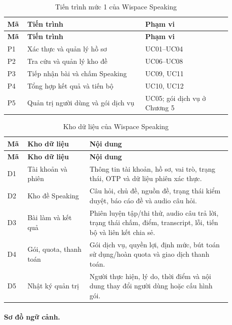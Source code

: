 \begin{longtable}{|>{\raggedright\arraybackslash}p{0.07\linewidth}|p{0.48\linewidth}|p{0.35\linewidth}|}
\caption{Tiến trình mức 1 của Wispace Speaking}\label{wispace:tab:dfd-processes}\\
\hline
\textbf{Mã} & \textbf{Tiến trình} & \textbf{Phạm vi} \\
\hline
\endfirsthead
\hline
\textbf{Mã} & \textbf{Tiến trình} & \textbf{Phạm vi} \\
\hline
\endhead
P1 & Xác thực và quản lý hồ sơ & UC01--UC04 \\
\hline
P2 & Tra cứu và quản lý kho đề & UC06--UC08 \\
\hline
P3 & Tiếp nhận bài và chấm Speaking & UC09, UC11 \\
\hline
P4 & Tổng hợp kết quả và tiến bộ & UC10, UC12 \\
\hline
P5 & Quản trị người dùng và gói dịch vụ & UC05; gói dịch vụ ở Chương 5 \\
\hline
\end{longtable}


\begin{longtable}{|>{\raggedright\arraybackslash}p{0.07\linewidth}|p{0.25\linewidth}|p{0.58\linewidth}|}
\caption{Kho dữ liệu của Wispace Speaking}\label{wispace:tab:dfd-stores}\\
\hline
\textbf{Mã} & \textbf{Kho dữ liệu} & \textbf{Nội dung} \\
\hline
\endfirsthead
\hline
\textbf{Mã} & \textbf{Kho dữ liệu} & \textbf{Nội dung} \\
\hline
\endhead
D1 & Tài khoản và phiên & Thông tin tài khoản, hồ sơ, vai trò, trạng thái, OTP và dữ liệu phiên xác thực. \\
\hline
D2 & Kho đề Speaking & Câu hỏi, chủ đề, nguồn đề, trạng thái kiểm duyệt, báo cáo đề và audio câu hỏi. \\
\hline
D3 & Bài làm và kết quả & Phiên luyện tập/thi thử, audio câu trả lời, trạng thái chấm, điểm, transcript, lỗi, tiến bộ và liên kết chia sẻ. \\
\hline
D4 & Gói, quota, thanh toán & Gói dịch vụ, quyền lợi, định mức, bút toán sử dụng/hoàn quota và giao dịch thanh toán. \\
\hline
D5 & Nhật ký quản trị & Người thực hiện, lý do, thời điểm và nội dung thay đổi người dùng hoặc cấu hình gói. \\
\hline
\end{longtable}


\clearpage

\paragraph{Sơ đồ ngữ cảnh.}

